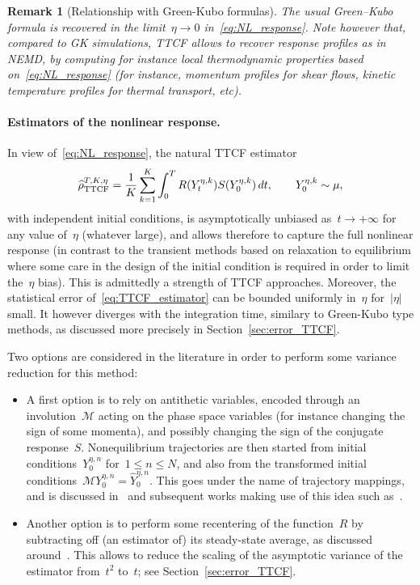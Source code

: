 \documentclass[11pt]{article}
\renewcommand{\leq}{\leqslant}
\newtheorem{remark}[theorem]{Remark}
\theoremstyle{definition}
\let\oldparagraph=\paragraph
\renewcommand\paragraph[1]{\oldparagraph{#1.}}
\newcommand{\TestTTCF}{\estTmp^{T,K,\eta}_{\rm TTCF}}
\newcommand{\estTmp}{\widehat{\rho}}
\begin{document}
\begin{remark}[Relationship with Green-Kubo formulas]
  The usual Green--Kubo formula is recovered in the limit~$\eta \to 0$ in~\eqref{eq:NL_response}. Note however that, compared to GK simulations, TTCF allows to recover response profiles as in NEMD, by computing for instance local thermodynamic properties based on~\eqref{eq:NL_response} (for instance, momentum profiles for shear flows, kinetic temperature profiles for thermal transport, etc).
\end{remark}

\paragraph{Estimators of the nonlinear response}

In view of~\eqref{eq:NL_response}, the natural TTCF estimator
\begin{equation}
  \label{eq:TTCF_estimator}
  \TestTTCF = \frac{1}{K} \sum_{k=1}^K \int_0^T R(Y_t^{\eta,k}) S(Y_0^{\eta,k}) \, dt, \qquad Y_0^{\eta,k} \sim \mu,
\end{equation}
with independent initial conditions, is asymptotically unbiased as~$t \to +\infty$ for any value of~$\eta$ (whatever large), and allows therefore to capture the full nonlinear response (in contrast to the transient methods based on relaxation to equilibrium where some care in the design of the initial condition is required in order to limit the~$\eta$ bias). This is admittedly a strength of TTCF approaches. Moreover, the statistical error of~\eqref{eq:TTCF_estimator} can be bounded uniformly in~$\eta$ for~$|\eta|$ small. It however diverges with the integration time, similary to Green-Kubo type methods, as discussed more precisely in Section~\ref{sec:error_TTCF}.

Two options are considered in the literature in order to perform some variance reduction for this method:
\begin{itemize}
\item A first option is to rely on antithetic variables, encoded through an involution~$\mathscr{M}$ acting on the phase space variables (for instance changing the sign of some momenta), and possibly changing the sign of the conjugate response~$S$. Nonequilibrium trajectories are then started from initial conditions~$Y_0^{\eta,n}$ for~$1 \leq n \leq N$, and also from the transformed initial conditions~$\mathscr{M}Y_0^{\eta,n} = \widehat{Y}_0^{\eta,n}$. This goes under the name of trajectory mappings, and is discussed in~\cite[Section~7.4]{evans2007} and subsequent works making use of this idea such as~\cite{delhommelle2005, maffioli2022, maffioli2024}.
\item Another option is to perform some recentering of the function~$R$ by subtracting off (an estimator of) its steady-state average, as discussed around~\cite[Eq.~(3)]{maffioli2024}. This allows to reduce the scaling of the asymptotic variance of the estimator from~$t^2$ to~$t$; see Section~\ref{sec:error_TTCF}.  
\end{itemize}
\end{document}

